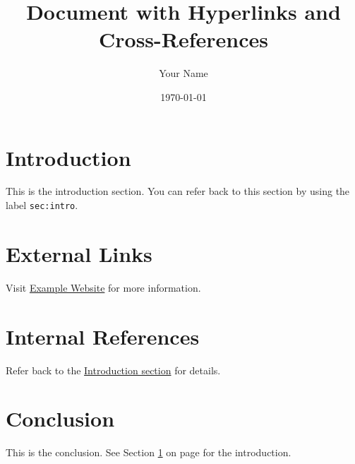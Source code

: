 \documentclass[11pt,a4paper]{article}
\title{Document with Hyperlinks and Cross-References}
\author{Your Name}
\date{\today}
\begin{document}
\maketitle

\tableofcontents %
\newpage %

\section{Introduction}\label{sec:intro}
This is the introduction section. You can refer back to this section by using the label \texttt{sec:intro}.

\section{External Links}
Visit \href{https://www.example.com}{Example Website} for more information. %

\section{Internal References}
Refer back to the \hyperref[sec:intro]{Introduction section} for details. %

\section{Conclusion}
This is the conclusion. See Section \ref{sec:intro} on page \pageref{sec:intro} for the introduction.
\end{document}

